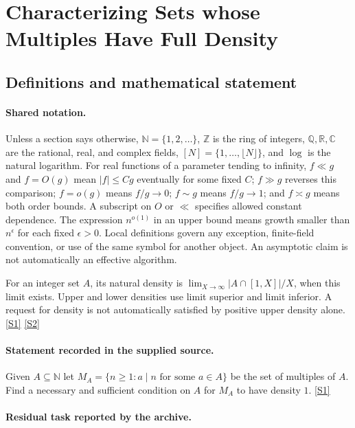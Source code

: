 \documentclass[11pt,a4paper]{article}
\newcommand{\N}{\mathbb{N}}
\newcommand{\Z}{\mathbb{Z}}
\newcommand{\Q}{\mathbb{Q}}
\newcommand{\R}{\mathbb{R}}
\newcommand{\C}{\mathbb{C}}
\newcommand{\sref}[2]{\hyperlink{source:#1:#2}{[S#2]}}
\begin{document}
\section{Characterizing Sets whose Multiples Have Full Density}\label{statement}


\subsection{Definitions and mathematical statement}

\paragraph{Shared notation.}Unless a section says otherwise, $\N=\{1,2,\ldots\}$,
$\Z$ is the ring of integers, $\Q,\R,\C$ are the rational, real, and complex
fields, $[N]=\{1,\ldots,\lfloor N\rfloor\}$, and $\log$ is the natural
logarithm. For real functions of a parameter tending to infinity,
$f\ll g$ and $f=O(g)$ mean $|f|\leq Cg$ eventually for some fixed $C$;
$f\gg g$ reverses this comparison; $f=o(g)$ means $f/g\to0$;
$f\sim g$ means $f/g\to1$; and $f\asymp g$ means both order bounds.
A subscript on $O$ or $\ll$ specifies allowed constant dependence.
The expression $n^{o(1)}$ in an upper bound means growth smaller than
$n^\epsilon$ for each fixed $\epsilon>0$. Local definitions govern any
exception, finite-field convention, or use of the same symbol for another
object. An asymptotic claim is not automatically an effective algorithm.



For an integer set $A$, its natural density is $\lim_{X\to\infty}|A\cap[1,X]|/X$, when this limit exists. Upper and lower densities use limit superior and limit inferior. A request for density is not automatically satisfied by positive upper density alone. \sref{statement}{1} \sref{statement}{2}

\paragraph{Statement recorded in the supplied source.}
Given $A\subseteq \mathbb{N}$ let $M_A=\{ n \geq 1 : a\mid n\textrm{ for some }a\in A\}$ be the set of multiples of $A$. Find a necessary and sufficient condition on $A$ for $M_A$ to have density $1$. \sref{statement}{1}

\paragraph{Residual task reported by the archive.}
\end{document}
